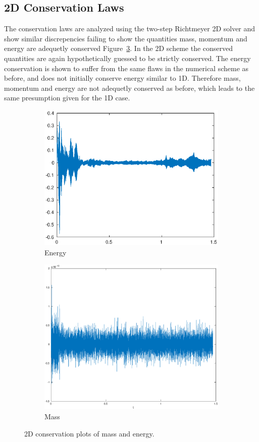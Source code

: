 \subsection{2D Conservation Laws}

The conservation laws are analyzed using the two-step Richtmeyer 2D solver and show similar discrepencies
failing to show the quantities mass, momentum and energy are adequetly conserved Figure~\ref{fig:2Dcons_A}. 
In the 2D scheme the conserved quantities are again hypothetically guessed to be strictly conserved. The energy 
conservation is shown to suffer from the same flaws in the numerical scheme as before, and does not initially conserve
energy similar to 1D. Therefore mass, momentum and energy are not adequetly conserved as before, which leads to the same
presumption given for the 1D case. 
\newline

\begin{figure}[h!]
    \centering
    \begin{subfigure}[b]{0.9\textwidth}
        \centering
        \includegraphics[width=1.1\textwidth,height=0.52\textwidth]{images/cons_energy.eps}\hfill
        \caption{Energy}
        \label{fig:Energy}
    \end{subfigure}
    \hfill
    \begin{subfigure}[b]{0.9\textwidth}
        \centering
        \includegraphics[width=1.1\textwidth, height=0.52\textwidth]{images/cons_mass.eps}\hfill
        \caption{Mass}
        \label{fig:Mass}
    \end{subfigure}
    \hfill
    \caption{2D conservation plots of mass and energy.}
    \label{fig:2Dcons_A}
\end{figure}


